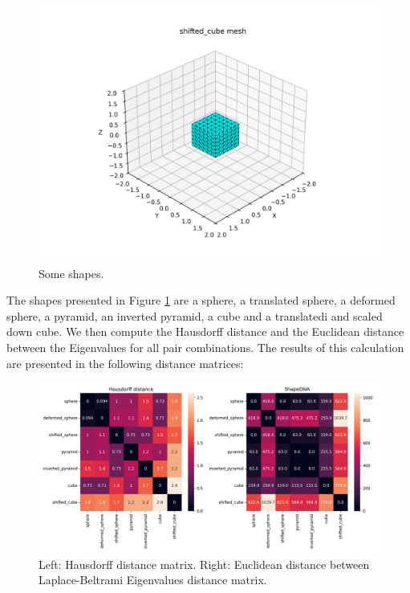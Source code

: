 \documentclass[11pt]{article}
\begin{document}
\begin{figure}[H]
    \begin{minipage}{0.3\textwidth}
        \centering
        \includegraphics[width=1.1\linewidth]{../figs/shifted_cube.png}

    \end{minipage}

    \caption{Some shapes.}
    \label{fig:all_figures}
\end{figure}

The shapes presented in Figure \ref{fig:all_figures} are a sphere, a translated sphere, a deformed sphere, a pyramid, an inverted pyramid, a cube and a translatedi and scaled down cube. We then compute the Hausdorff distance and the Euclidean distance between the Eigenvalues for all pair combinations. The results of this calculation are presented in the following distance matrices:

\begin{figure}[H]
    \centering
    \includegraphics[width=\linewidth]{../figs/results/distance_matrices.png}  %
    \caption{Left: Hausdorff distance matrix. Right: Euclidean distance between Laplace-Beltrami Eigenvalues distance matrix.}
    \label{fig:d_matr}
\end{figure}
\end{document}
